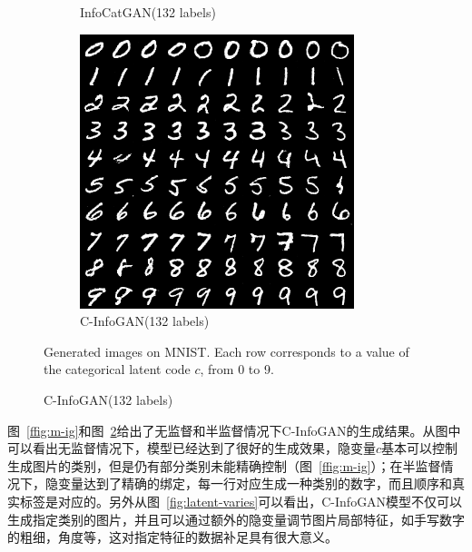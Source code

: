 \begin{figure}[htbp]
\begin{subfigure}[b]{\trif\textwidth}
    \caption{InfoCatGAN(132 labels)}
    \label{ffig:m-ss-icg}
  \end{subfigure}
  \begin{subfigure}[b]{\trif\textwidth}
    \includegraphics[width=\textwidth]{Img/cig-132labels-new.png}
    \caption{C-InfoGAN(132 labels)}
    \label{ffig:m-ss-ig}
  \end{subfigure}

  {Generated images on MNIST. Each row corresponds to a value of the categorical latent code $c$, from 0 to 9.}
  \label{fig:mnist}
\end{figure}

图~\ref{ffig:m-ig}和图~\ref{ffig:m-ss-ig}给出了无监督和半监督情况下C-InfoGAN的生成结果。从图中可以看出无监督情况下，模型已经达到了很好的生成效果，隐变量$c$基本可以控制生成图片的类别，但是仍有部分类别未能精确控制（图~\ref{ffig:m-ig}）；在半监督情况下，隐变量达到了精确的绑定，每一行对应生成一种类别的数字，而且顺序和真实标签是对应的。另外从图~\ref{fig:latent-varies}可以看出，C-InfoGAN模型不仅可以生成指定类别的图片，并且可以通过额外的隐变量调节图片局部特征，如手写数字的粗细，角度等，这对指定特征的数据补足具有很大意义。

